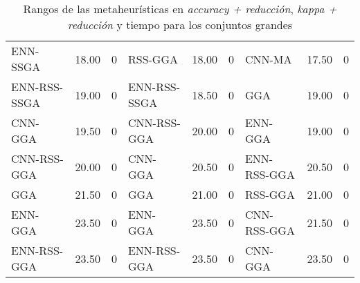 \begin{table}[]
\begin{adjustbox}{max width =\textwidth}
\begin{tabular}{l c c|l c c|l c c}
ENN-SSGA     & 18.00 & 0 & RSS-GGA      & 18.00 & 0 & CNN-MA       & 17.50 & 0 \\
ENN-RSS-SSGA & 19.00 & 0 & ENN-RSS-SSGA & 18.50 & 0 & GGA          & 19.00 & 0 \\
CNN-GGA      & 19.50 & 0 & CNN-RSS-GGA  & 20.00 & 0 & ENN-GGA      & 19.00 & 0 \\
CNN-RSS-GGA  & 20.00 & 0 & CNN-GGA      & 20.50 & 0 & ENN-RSS-GGA  & 20.50 & 0 \\
GGA          & 21.50 & 0 & GGA          & 21.00 & 0 & RSS-GGA      & 21.00 & 0 \\
ENN-GGA      & 23.50 & 0 & ENN-GGA      & 23.50 & 0 & CNN-RSS-GGA  & 21.50 & 0 \\
ENN-RSS-GGA  & 23.50 & 0 & ENN-RSS-GGA  & 23.50 & 0 & CNN-GGA      & 23.50 & 0 \\

\hline
\end{tabular}
\end{adjustbox}
\caption{Rangos de las metaheurísticas en \emph{accuracy + reducción}, \emph{kappa + reducción} y tiempo para los conjuntos grandes}
\label{table-inits-rank}
\end{table}


